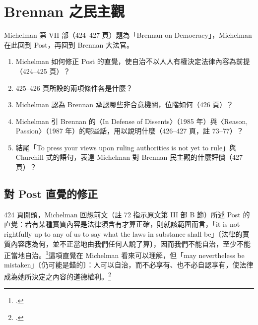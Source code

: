 \chapter{Brennan 之民主觀}
\label{ch:50_brennan}

\begin{qaquestion}
Michelman 第 VII 部（424--427 頁）題為「Brennan on Democracy」，Michelman 在此回到 Post，再回到 Brennan 大法官。
\begin{enumerate}
\tightlist
\item Michelman 如何修正 Post 的直覺，使自治不以人人有權決定法律內容為前提（424--425 頁）？
\item 425--426 頁所設的兩項條件各是什麼？
\item Michelman 認為 Brennan 承認哪些非合意機關，位階如何（426 頁）？
\item Michelman 引 Brennan 的〈In Defense of Dissents〉（1985 年）與〈Reason, Passion〉（1987 年）的哪些話，用以說明什麼（426--427 頁，註 73--77）？
\item 結尾「To press your views upon ruling authorities is not yet to rule」與 Churchill 式的語句，表達 Michelman 對 Brennan 民主觀的什麼評價（427 頁）？
\end{enumerate}
\end{qaquestion}

\section{對 Post 直覺的修正}
\label{sec:50_brennan-1}

424 頁開頭，Michelman 回想前文（註 72 指示原文第 III 部 B 節）所述 Post 的直覺：若有某種實質內容是法律須含有才算正確，則就該範圍而言，「it is not rightfully up to any of us to say what the laws in substance shall be」〔法律的實質內容應為何，並不正當地由我們任何人說了算〕，因而我們不能自治，至少不能正當地自治。\footcite[424 \& n.72]{michelman1998}這項直覺在 Michelman 看來可以理解，但「may nevertheless be mistaken」〔仍可能是錯的〕：人可以自治，而不必享有、也不必自認享有，使法律成為她所決定之內容的道德權利。\footcite[424]{michelman1998}

